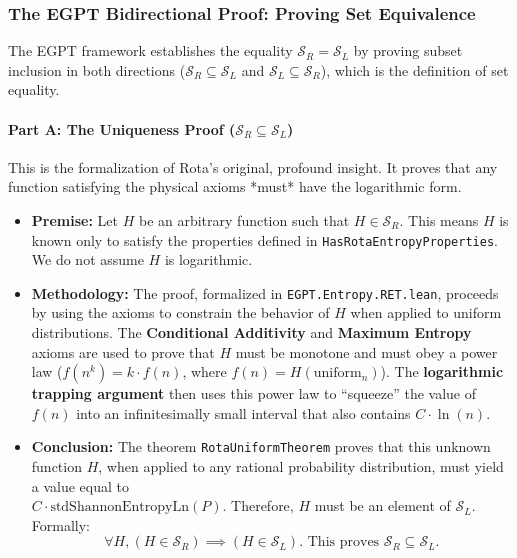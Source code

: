 \documentclass[11pt, letterpaper]{article}
\begin{document}
\subsubsection{The EGPT Bidirectional Proof: Proving Set Equivalence}

The EGPT framework establishes the equality $\mathcal{S}_R = \mathcal{S}_L$ by proving subset inclusion in both directions ($\mathcal{S}_R \subseteq \mathcal{S}_L$ and $\mathcal{S}_L \subseteq \mathcal{S}_R$), which is the definition of set equality.

\paragraph{Part A: The Uniqueness Proof ($\mathcal{S}_R \subseteq \mathcal{S}_L$)}
This is the formalization of Rota's original, profound insight. It proves that any function satisfying the physical axioms *must* have the logarithmic form.

\begin{itemize}
    \item \textbf{Premise:} Let $H$ be an arbitrary function such that $H \in \mathcal{S}_R$. This means $H$ is known only to satisfy the properties defined in \texttt{HasRotaEntropyProperties}. We do not assume $H$ is logarithmic.
    
    \item \textbf{Methodology:} The proof, formalized in \texttt{EGPT.Entropy.RET.lean}, proceeds by using the axioms to constrain the behavior of $H$ when applied to uniform distributions. The \textbf{Conditional Additivity} and \textbf{Maximum Entropy} axioms are used to prove that $H$ must be monotone and must obey a power law ($f(n^k) = k \cdot f(n)$, where $f(n) = H(\text{uniform}_n)$). The \textbf{logarithmic trapping argument} then uses this power law to ``squeeze'' the value of $f(n)$ into an infinitesimally small interval that also contains $C \cdot \ln(n)$.
    
    \item \textbf{Conclusion:} The theorem \texttt{RotaUniformTheorem} proves that this unknown function $H$, when applied to any rational probability distribution, must yield a value equal to \\ $C \cdot \text{stdShannonEntropyLn}(P)$. Therefore, $H$ must be an element of $\mathcal{S}_L$. Formally:
    \[ \forall H, (H \in \mathcal{S}_R) \implies (H \in \mathcal{S}_L). \text{ This proves } \mathcal{S}_R \subseteq \mathcal{S}_L. \]
\end{itemize}
\end{document}
